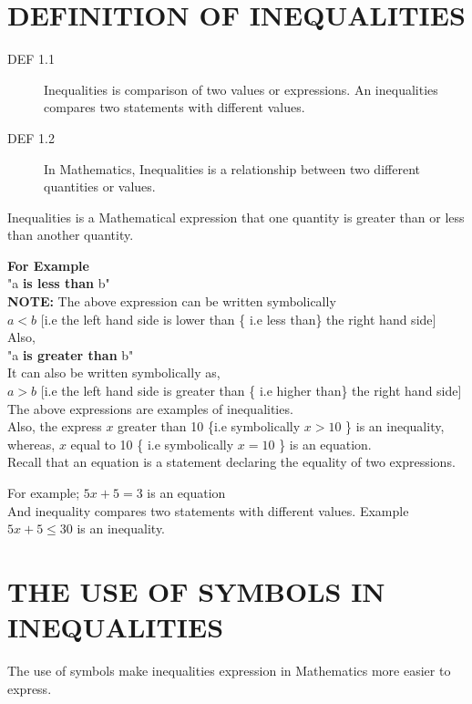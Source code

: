 \documentclass[12pt]{report}
\newcommand{\bt}[1]{\textbf{#1}}
\newcommand{\spn}[1]{\\[#1cm]}
\newcommand{\NI}{\noindent}
\begin{document}
	
	\section{DEFINITION OF INEQUALITIES}
	\begin{description}
		\item[DEF 1.1] Inequalities is comparison of two values or expressions. An inequalities compares two statements with different values.
		\item[DEF 1.2] In Mathematics, Inequalities is a relationship between two different quantities or values.
	\end{description}
	Inequalities is a Mathematical expression that one quantity is greater than or less than another quantity.
	
	\NI\bt{For Example}\\
	"a\bt{ is less than } b"\spn{-.4}
	
	\NI \bt{NOTE:} The above expression can be written symbolically\\
	$\displaystyle a < b$ [i.e the left hand side is lower than \{ i.e less than\} the right hand side]\spn{-0.3}
	
	\NI Also,\\
	"a \bt{is greater than } b"\\
	It can also be written symbolically as,\\
	$\displaystyle a > b$ [i.e the left hand side is greater than \{ i.e higher than\} the right hand side]\spn{-0.3}
	
	\NI The above expressions are examples of inequalities.\\
	
	\NI Also, the express $x$ greater than 10 \{i.e symbolically $x > 10$ \} is an inequality, whereas, $x$ equal to 10 \{ i.e symbolically $x = 10$ \} is an equation.\\
	
	\NI Recall that an equation is a statement declaring the equality of two expressions.
	
	\NI For example; $5x + 5 = 3$ is an equation\spn{-.5}
	
	\NI And inequality compares two statements with different values. Example $5x + 5 \leq 30$ is an inequality.
	
	\section{THE USE OF SYMBOLS IN INEQUALITIES}
	
	The use of symbols make inequalities expression in Mathematics more easier to express.\spn{-.3}
	
\end{document}
